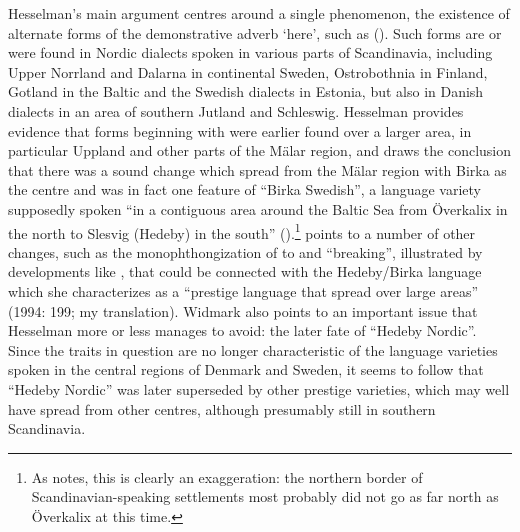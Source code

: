 Hesselman’s main argument centres around a single phenomenon, the existence of alternate forms of the demonstrative adverb  ‘here’, such as  (). Such forms are or were found in Nordic dialects spoken in various parts of Scandinavia, including Upper Norrland and Dalarna in continental Sweden, Ostrobothnia in Finland, Gotland in the Baltic and the Swedish dialects in Estonia, but also in Danish dialects in an area of southern Jutland and Schleswig. Hesselman provides evidence that forms beginning with  were earlier found over a larger area, in particular Uppland and other parts of the Mälar region, and draws the conclusion that there was a sound change  which spread from the Mälar region with Birka as the centre and was in fact one feature of “Birka Swedish”, a language variety supposedly spoken “in a contiguous area around the Baltic Sea from Överkalix in the north to Slesvig (Hedeby) in the south” (\citet[158]{Hesselman1936}).\footnote{ As \citet{Widmark1994} notes, this is clearly an exaggeration: the northern border of Scandinavian-speaking settlements most probably did not go as far north as Överkalix at this time.} \citet{Widmark1994} points to a number of other changes,  such as the monophthongization of  to and “breaking”, illustrated by developments like , that could be connected with the Hedeby/Birka language which she characterizes as a “prestige language that spread over large areas” (1994: 199; my translation). Widmark also points to an important issue that Hesselman more or less manages to avoid: the later fate of “Hedeby Nordic”. Since the traits in question are no longer characteristic of the language varieties spoken in the central regions of Denmark and Sweden, it seems to follow that “Hedeby Nordic” was later superseded by other prestige varieties, which may well have spread from other centres, although presumably still in southern Scandinavia. 

